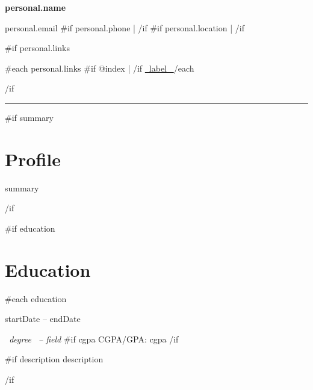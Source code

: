 \documentclass[10pt,a4paper]{article}
\begin{document}
\color{bodytext}

{\fontsize{26}{29}\selectfont
\bfseries\color{deepgreen}
{{personal.name}}
\par}

\vspace{3pt}

{\small\color{secondary}
{{personal.email}}
{{#if personal.phone}}
\enspace | 
{{/if}}
{{#if personal.location}}
\enspace | 
{{/if}}
\par}

{{#if personal.links}}
\vspace{2pt}
{\small
{{#each personal.links}}
{{#if @index}}
\enspace | \enspace
{{/if}}
\href{ {{~url~}} }{ {{~label~}} }
{{/each}}
\par}
{{/if}}

\vspace{4pt}
{\color{forest}\rule{\textwidth}{2pt}}

{{#if summary}}
\section{Profile}

{{summary}}

{{/if}}

{{#if education}}
\section{Education}

{{#each education}}

\textbf{ }
\hfill
{\small\color{secondary}
{{startDate}} -- {{endDate}}
}
\par

\textit{ {{~degree~}} -- {{field}} }
{{#if cgpa}}
\hfill
{\small CGPA/GPA: {{cgpa}} }
{{/if}}
\par

{{#if description}}
\vspace{2pt}
{{description}}
\par
{{/if}}
\end{document}
